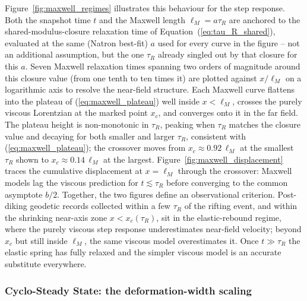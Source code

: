 \documentclass[extra]{gji}
\begin{document}
Figure~\ref{fig:maxwell_regimes} illustrates this behaviour for the step
response.  Both the snapshot time $t$ and the Maxwell length $\ell_M
= a\tau_R$ are anchored to the shared-modulus-closure relaxation time of
Equation~(\ref{eq:tau_R_shared}), evaluated at the same (Natron best-fit)
$a$ used for every curve in the figure -- not an additional assumption,
but the one $\tau_R$ already singled out by that closure for this $a$.
Seven Maxwell relaxation times spanning two orders of magnitude around
this closure value (from one tenth to ten times it) are plotted against
$x/\ell_M$ on a logarithmic axis to resolve the near-field structure.
Each Maxwell curve flattens into the plateau of
(\ref{eq:maxwell_plateau}) well inside $x<\ell_M$, crosses the purely
viscous Lorentzian at the marked point $x_c$, and converges onto it in
the far field.  The plateau height is non-monotonic in $\tau_R$, peaking
when $\tau_R$ matches the closure value and decaying for both smaller and
larger $\tau_R$, consistent with (\ref{eq:maxwell_plateau}); the crossover
moves from $x_c\approx0.92\,\ell_M$ at the smallest $\tau_R$ shown to
$x_c\approx0.14\,\ell_M$ at the largest.
Figure~\ref{fig:maxwell_displacement} traces the cumulative displacement
at $x = \ell_M$ through the crossover: Maxwell models lag the viscous
prediction for $t \lesssim \tau_R$ before converging to the common
asymptote $b/2$.  Together, the two figures define an observational
criterion.  Post-diking geodetic records collected within a few $\tau_R$
of the rifting event, and within the shrinking near-axis zone
$x<x_c(\tau_R)$, sit in the elastic-rebound regime, where the purely
viscous step response underestimates near-field velocity; beyond $x_c$
but still inside $\ell_M$, the same viscous model overestimates it.  Once
$t \gg \tau_R$ the elastic spring has fully relaxed and the simpler
viscous model is an accurate substitute everywhere.

\subsubsection{Cyclo-Steady State: the deformation-width scaling}
\end{document}
